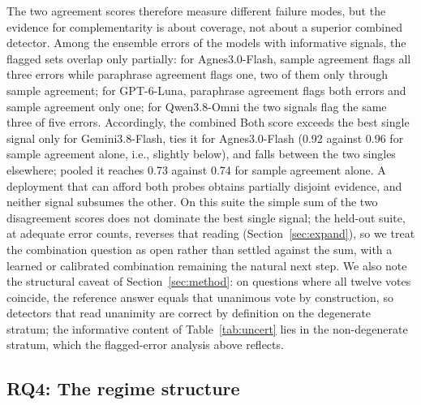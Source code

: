 The two agreement scores therefore measure different failure modes, but the evidence for complementarity is about coverage, not about a superior combined detector. Among the ensemble errors of the models with informative signals, the flagged sets overlap only partially: for Agnes3.0-Flash, sample agreement flags all three errors while paraphrase agreement flags one, two of them only through sample agreement; for GPT-6-Luna, paraphrase agreement flags both errors and sample agreement only one; for Qwen3.8-Omni the two signals flag the same three of five errors. Accordingly, the combined Both score exceeds the best single signal only for Gemini3.8-Flash, ties it for Agnes3.0-Flash (0.92 against 0.96 for sample agreement alone, i.e., slightly below), and falls between the two singles elsewhere; pooled it reaches 0.73 against 0.74 for sample agreement alone. A deployment that can afford both probes obtains partially disjoint evidence, and neither signal subsumes the other. On this suite the simple sum of the two disagreement scores does not dominate the best single signal; the held-out suite, at adequate error counts, reverses that reading (Section~\ref{sec:expand}), so we treat the combination question as open rather than settled against the sum, with a learned or calibrated combination remaining the natural next step. We also note the structural caveat of Section~\ref{sec:method}: on questions where all twelve votes coincide, the reference answer equals that unanimous vote by construction, so detectors that read unanimity are correct by definition on the degenerate stratum; the informative content of Table~\ref{tab:uncert} lies in the non-degenerate stratum, which the flagged-error analysis above reflects.

\subsection{RQ4: The regime structure}
\label{sec:rq4}

